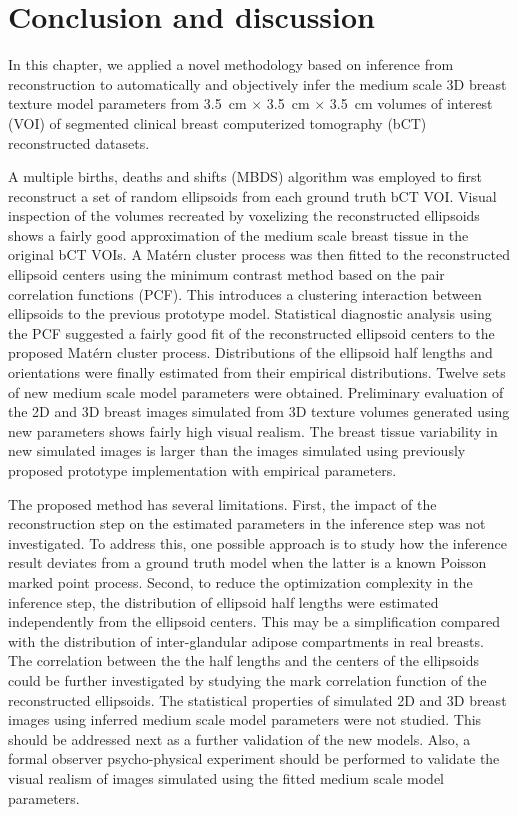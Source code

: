 \documentclass[journal]{IEEEtran}
\begin{document}
\section{Conclusion and discussion}
\label{sec:concl-disc}

In this chapter, we applied a novel methodology based on inference
from reconstruction to automatically and objectively infer the medium
scale 3D breast texture model parameters from \SI{3.5}{\cm} $\times$
\SI{3.5}{\cm} $\times$ \SI{3.5}{\cm} volumes of interest (VOI) of
segmented clinical breast computerized tomography (bCT) reconstructed
datasets.

A multiple births, deaths and shifts (MBDS) algorithm was employed to
first reconstruct a set of random ellipsoids from each ground truth
bCT VOI. Visual inspection of the volumes recreated by voxelizing the
reconstructed ellipsoids shows a fairly good approximation of the
medium scale breast tissue in the original bCT VOIs. A Mat\'{e}rn
cluster process was then fitted to the reconstructed ellipsoid centers
using the minimum contrast method based on the pair correlation
functions (PCF). This introduces a clustering interaction between
ellipsoids to the previous prototype model. Statistical diagnostic
analysis using the PCF suggested a fairly good fit of the
reconstructed ellipsoid centers to the proposed Mat\'{e}rn cluster
process. Distributions of the ellipsoid half lengths and orientations
were finally estimated from their empirical distributions. Twelve sets
of new medium scale model parameters were obtained. Preliminary
evaluation of the 2D and 3D breast images simulated from 3D texture
volumes generated using new parameters shows fairly high visual
realism. The breast tissue variability in new simulated images is
larger than the images simulated using previously proposed prototype
implementation with empirical parameters.

The proposed method has several limitations. First, the impact of the
reconstruction step on the estimated parameters in the inference step
was not investigated. To address this, one possible approach is to
study how the inference result deviates from a ground truth model when
the latter is a known Poisson marked point process. Second, to reduce
the optimization complexity in the inference step, the distribution of
ellipsoid half lengths were estimated independently from the ellipsoid
centers. This may be a simplification compared with the distribution
of inter-glandular adipose compartments in real breasts. The
correlation between the the half lengths and the centers of the
ellipsoids could be further investigated by studying the mark
correlation function of the reconstructed ellipsoids. The statistical
properties of simulated 2D and 3D breast images using inferred medium
scale model parameters were not studied. This should be addressed next
as a further validation of the new models. Also, a formal observer
psycho-physical experiment should be performed to validate the visual
realism of images simulated using the fitted medium scale model
parameters.
\end{document}
